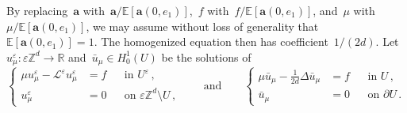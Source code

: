 \documentclass[11pt]{amsart}
\theoremstyle{plain}
\theoremstyle{definition}
\theoremstyle{remark}
\newcommand{\E}{\mathbb{E}}
\newcommand{\Zd}{\mathbb{Z}^d}
\newcommand{\R}{\mathbb{R}}
\renewcommand{\a}{\mathbf{a}}
\newcommand{\eps}{\varepsilon}
\begin{document}
	By replacing~$\a$ with~$\a/\E[\a(0,e_1)]$,~$f$ with~$f/\E[\a(0,e_1)]$, and~$\mu$ with~$\mu/\E[\a(0,e_1)]$, we may assume without loss of generality that~$\E[\a(0,e_1)] = 1$.
	The homogenized equation then has coefficient~$1/(2d)$.
	Let~$u^\eps_\mu \colon \eps \Zd \to \R$ and~$\bar u_\mu \in H^1_0(U)$ be the solutions of
	\begin{equation} \label{e.defHomogtheorem}
		\left\{ \begin{aligned}
			\mu u^{\eps}_\mu - \mathcal{L}^{\eps} u^{\eps}_\mu &= f && \text{in } U^\eps\,, \\
			u^{\eps}_\mu &= 0  && \text{on } \eps \Zd \setminus U\,,
		\end{aligned} \right.
		\qquad \text{and} \qquad
		\left\{ \begin{aligned}
			\mu \bar u_\mu - \frac{1}{2d} \Delta \bar u_\mu &= f && \text{in } U\,, \\
			\bar u_\mu &= 0  && \text{on } \partial U\,.
		\end{aligned} \right.
	\end{equation}
	
\end{document}
